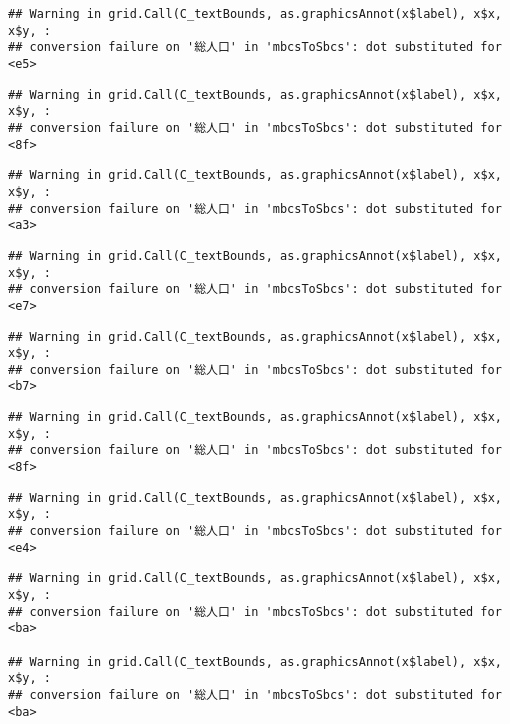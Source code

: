 \documentclass[
]{article}
\begin{document}
\begin{verbatim}
## Warning in grid.Call(C_textBounds, as.graphicsAnnot(x$label), x$x, x$y, :
## conversion failure on '総人口' in 'mbcsToSbcs': dot substituted for <e5>
\end{verbatim}

\begin{verbatim}
## Warning in grid.Call(C_textBounds, as.graphicsAnnot(x$label), x$x, x$y, :
## conversion failure on '総人口' in 'mbcsToSbcs': dot substituted for <8f>
\end{verbatim}

\begin{verbatim}
## Warning in grid.Call(C_textBounds, as.graphicsAnnot(x$label), x$x, x$y, :
## conversion failure on '総人口' in 'mbcsToSbcs': dot substituted for <a3>
\end{verbatim}

\begin{verbatim}
## Warning in grid.Call(C_textBounds, as.graphicsAnnot(x$label), x$x, x$y, :
## conversion failure on '総人口' in 'mbcsToSbcs': dot substituted for <e7>
\end{verbatim}

\begin{verbatim}
## Warning in grid.Call(C_textBounds, as.graphicsAnnot(x$label), x$x, x$y, :
## conversion failure on '総人口' in 'mbcsToSbcs': dot substituted for <b7>
\end{verbatim}

\begin{verbatim}
## Warning in grid.Call(C_textBounds, as.graphicsAnnot(x$label), x$x, x$y, :
## conversion failure on '総人口' in 'mbcsToSbcs': dot substituted for <8f>
\end{verbatim}

\begin{verbatim}
## Warning in grid.Call(C_textBounds, as.graphicsAnnot(x$label), x$x, x$y, :
## conversion failure on '総人口' in 'mbcsToSbcs': dot substituted for <e4>
\end{verbatim}

\begin{verbatim}
## Warning in grid.Call(C_textBounds, as.graphicsAnnot(x$label), x$x, x$y, :
## conversion failure on '総人口' in 'mbcsToSbcs': dot substituted for <ba>

## Warning in grid.Call(C_textBounds, as.graphicsAnnot(x$label), x$x, x$y, :
## conversion failure on '総人口' in 'mbcsToSbcs': dot substituted for <ba>
\end{verbatim}
\end{document}
